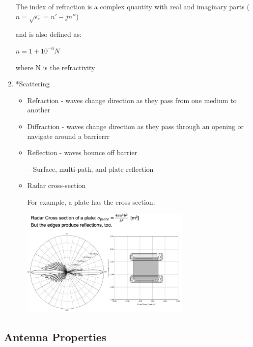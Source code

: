 \documentclass[10pt]{article}
\begin{document}
\begin{enumerate}
	The index of refraction is a complex quantity with real and imaginary parts ($n = \sqrt{\epsilon_r} = n' - jn''$)
	
	and is also defined as:
	
	\centerline{$n = 1 + 10^{-6}N$}
	
	where N is the refractivity
	
	\item*{Scattering}
	\begin{itemize}
	\item Refraction - waves change direction as they pass from one medium to another
	\item Diffraction - waves change direction as they pass through an opening or navigate around a barrierrr
	\item Reflection - waves bounce off barrier

	– Surface, multi-path, and plate reflection

	\item Radar cross-section
		
		For example, a plate has the cross section: 
		
		\includegraphics[width=0.69\textwidth]{figs/RCS_plate.png}
	
	\end{itemize}


\end{enumerate}


\subsection*{Antenna Properties}
\end{document}
